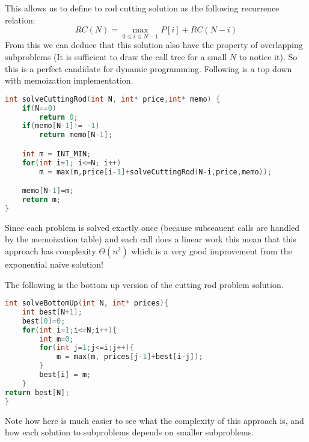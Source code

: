 This allows us to define to rod cutting solution as the following recurrence relation:
\[
RC(N) = \max_{0\leq i\leq N-1} P[i] + RC(N-i)
\]
From this we can deduce that this solution also have the property of overlapping subproblems (It is sufficient to draw the call tree for a small $N$ to notice it).
So this is a perfect candidate for dynamic programming.
Following is a top down with memoization implementation.
\begin{lstlisting}[language=c++, caption="Binary knapsack problem -Memoized solution",label=list:knapqudratic]
int solveCuttingRod(int N, int* price,int* memo) {
    if(N==0)
        return 0;
    if(memo[N-1]!= -1)
        return memo[N-1];

    int m = INT_MIN;
    for(int i=1; i<=N; i++)
        m = max(m,price[i-1]+solveCuttingRod(N-i,price,memo));

    memo[N-1]=m;
    return m;
}

	\end{lstlisting}
Since each problem is solved exactly once (because subseauent calls are handled by the memoization table) and each call does a linear work this mean that this approach has complexity $\Theta(n^2)$ which is a very good improvement from the exponential naive solution!

The following is the bottom up version of the cutting rod problem solution.
\begin{lstlisting}[language=c++, caption="Binary knapsack problem -Memoized solution",label=list:knapqudratic]
int solveBottomUp(int N, int* prices){
    int best[N+1];
    best[0]=0;
    for(int i=1;i<=N;i++){
        int m=0;
        for(int j=1;j<=i;j++){
            m = max(m, prices[j-1]+best[i-j]);
        }
        best[i] = m;
    }
return best[N];
}
	\end{lstlisting}

Note how here is much easier to see what the complexity of this approach is, and how each solution to subproblems depends on smaller subproblems.

